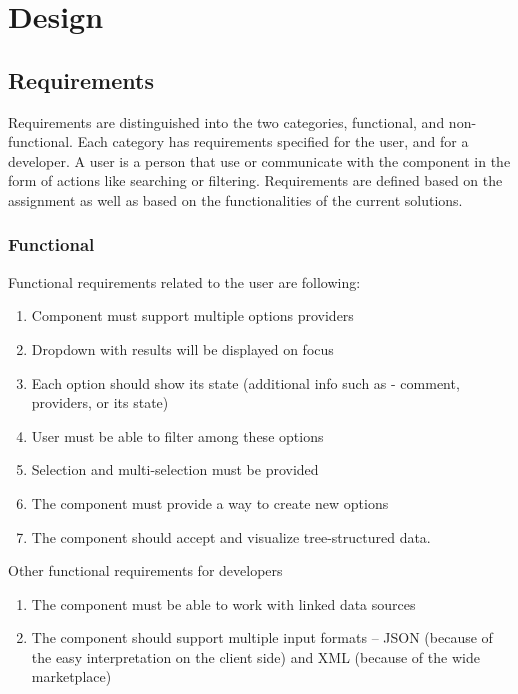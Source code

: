 
\chapter{Design} %

\label{Chapter4} %

 

\section{Requirements}

Requirements are distinguished into the two categories, functional, and non-functional. Each category has requirements specified for the user, and for a developer. A user is a person that use or communicate with the component in the form of actions like searching or filtering. Requirements are defined based on the assignment as well as based on the functionalities of the current solutions.


\subsection{Functional}

Functional requirements related to the user are following:
\begin{enumerate}
    \item Component must support multiple options providers
    \item Dropdown with results will be displayed on focus
    \item Each option should show its state (additional info such as - comment, providers, or its state)
    \item User must be able to filter among these options
    \item Selection and multi-selection must be provided
    \item The component must provide a way to create new options
    \item The component should accept and visualize tree-structured data.
\end{enumerate}
Other functional requirements for developers
\begin{enumerate}[resume]
    \item The component must be able to work with linked data sources
    \item The component should support multiple input formats – JSON (because of the easy interpretation on the client side) and XML (because of the wide marketplace) 
\end{enumerate}

